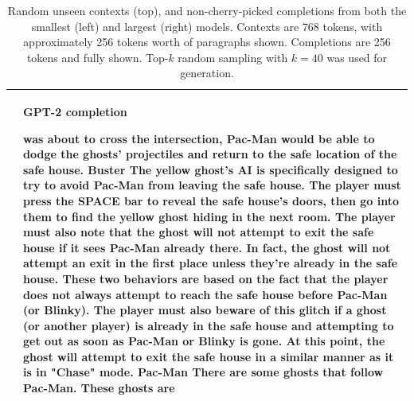 \documentclass{article}
\begin{document}
\begin{table}[t]
\begin{center}
\begin{tabular}{|p{8cm}|p{8cm}|}
  &
  \centerline{\textbf{GPT-2 completion}}
 was about to cross the intersection, Pac-Man would be able to dodge the ghosts' projectiles and return to the safe location of the safe house. \newline\newline Buster \newline\newline The yellow ghost's AI is specifically designed to try to avoid Pac-Man from leaving the safe house. The player must press the SPACE bar to reveal the safe house's doors, then go into them to find the yellow ghost hiding in the next room. \newline\newline  The player must also note that the ghost will not attempt to exit the safe house if it sees Pac-Man already there. In fact, the ghost will not attempt an exit in the first place unless they're already in the safe house. \newline\newline These two behaviors are based on the fact that the player does not always attempt to reach the safe house before Pac-Man (or Blinky). \newline\newline The player must also beware of this glitch if a ghost (or another player) is already in the safe house and attempting to get out as soon as Pac-Man or Blinky is gone. At this point, the ghost will attempt to exit the safe house in a similar manner as it is in "Chase" mode. \newline\newline  Pac-Man \newline\newline  There are some ghosts that follow Pac-Man. These ghosts are

 \\
\hline


\end{tabular}
\caption{Random unseen contexts (top), and non-cherry-picked completions from both the smallest (left) and largest (right) models. Contexts are 768 tokens, with approximately 256 tokens worth of paragraphs shown.  Completions are 256 tokens and fully shown.
Top-$k$ random sampling with $k = 40$ was used for generation.}
\label{samplescompare3}
\end{center}
\end{table}
\end{document}
